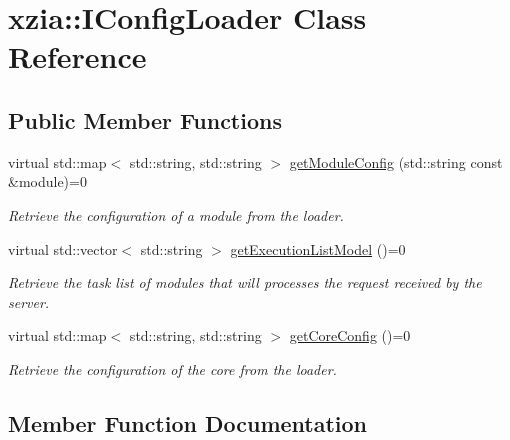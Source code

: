 \hypertarget{classxzia_1_1IConfigLoader}{}\section{xzia\+:\+:I\+Config\+Loader Class Reference}
\label{classxzia_1_1IConfigLoader}
\subsection*{Public Member Functions}
\begin{DoxyCompactItemize}
\item 
virtual std\+::map$<$ std\+::string, std\+::string $>$ \mbox{\hyperlink{classxzia_1_1IConfigLoader_acc495c84824d91f3baf1bfdbce2d4f60}{get\+Module\+Config}} (std\+::string const \&module)=0
\begin{DoxyCompactList}\small\item\em Retrieve the configuration of a module from the loader. \end{DoxyCompactList}\item 
virtual std\+::vector$<$ std\+::string $>$ \mbox{\hyperlink{classxzia_1_1IConfigLoader_a978f88a37cacd8ad84bd3ae995e5a7ba}{get\+Execution\+List\+Model}} ()=0
\begin{DoxyCompactList}\small\item\em Retrieve the task list of modules that will processes the request received by the server. \end{DoxyCompactList}\item 
virtual std\+::map$<$ std\+::string, std\+::string $>$ \mbox{\hyperlink{classxzia_1_1IConfigLoader_a343df444ba504f635e7204445105bbef}{get\+Core\+Config}} ()=0
\begin{DoxyCompactList}\small\item\em Retrieve the configuration of the core from the loader. \end{DoxyCompactList}\end{DoxyCompactItemize}


\subsection{Member Function Documentation}
\mbox{\label{classxzia_1_1IConfigLoader_a343df444ba504f635e7204445105bbef}} 
